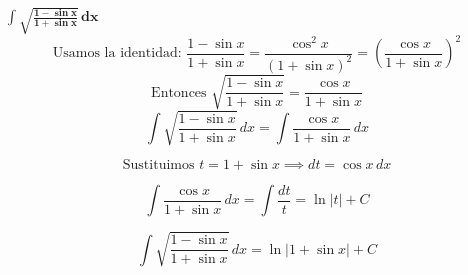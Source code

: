 $\displaystyle \mathbf{\int \sqrt{\frac{1-\sin x}{1+\sin x}}\,dx}$
\nopagebreak
\[
\text{Usamos la identidad: } \frac{1-\sin x}{1+\sin x} = \frac{\cos^2 x}{(1+\sin x)^2} = \left(\frac{\cos x}{1+\sin x}\right)^2
\]
\[
\text{Entonces } \sqrt{\frac{1-\sin x}{1+\sin x}} = \frac{\cos x}{1+\sin x}
\]
\[
\int \sqrt{\frac{1-\sin x}{1+\sin x}}\,dx = \int \frac{\cos x}{1+\sin x}\,dx
\]

\[
\text{Sustituimos } t = 1+\sin x \implies dt = \cos x\, dx
\]

\[
\int \frac{\cos x}{1+\sin x}\,dx = \int \frac{dt}{t} = \ln|t| + C
\]

\[
\boxed{\displaystyle 
\int \sqrt{\frac{1-\sin x}{1+\sin x}}\,dx = \ln|1+\sin x| + C
}
\]
